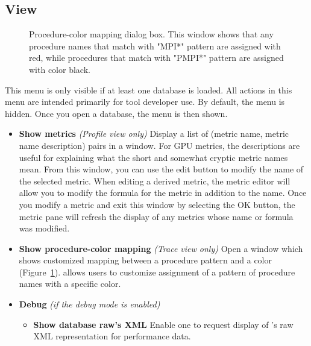 
\subsection{View}

\begin{figure}[t]
\caption{Procedure-color mapping dialog box. This window shows that any procedure names that match with "MPI*" pattern are assigned with red, while procedures that match with "PMPI*" pattern are assigned with color black.}
\label{fig:hpctraceviewer-mapping}
\end{figure}


This menu is only visible if at least one database is loaded.
All actions in this menu are intended primarily for tool developer use. 
By default, the menu is hidden. Once you open a database, the menu is then shown.

\begin{itemize}

 \item \textbf{Show metrics}   \textit{(Profile view only)}
 Display a list of (metric name, metric name description) pairs in a window. For GPU metrics, the descriptions are useful for explaining what the short and somewhat cryptic metric names mean.
 From this window, you can use the edit button to modify the name of the selected metric. When editing a derived metric, the metric editor will allow you to modify the formula for the metric in addition to the name.
 Once you modify a metric and exit this window by selecting the OK button, the metric pane will refresh the display of any metrics whose name or formula was modified.
 
 \item \textbf{Show procedure-color mapping} \textit{(Trace view only)} 
  Open a window which shows customized mapping between a procedure pattern and a color (Figure~\ref{fig:hpctraceviewer-mapping}). \hpctraceviewer{} allows users to customize assignment of a pattern of procedure names with a specific color.
 
 \item \textbf{Debug} \emph{(if the debug mode is enabled)}

   \begin{itemize}
     \item \textbf{Show database raw's XML}
 	Enable one to request display of \HPCToolkit{}'s raw XML representation for performance data.

  \end{itemize}

\end{itemize}

